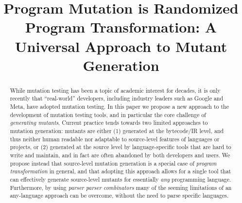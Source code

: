 \documentclass[sigconf,review, anonymous]{acmart}
\begin{document}
\title{Program Mutation is Randomized Program Transformation: A
  Universal Approach to Mutant Generation}




\newcommand{\mr}[2]{\multirow{#1}{*}{#2}}
\newcommand{\mc}[3]{\multicolumn{#1}{#2}{#3}}
\newcommand{\um}{\texttt{universalmutator}\xspace}
\newcommand{\clg}[1]{\textcolor{blue}{#1}}
\newcommand{\adg}[1]{\textcolor{purple}{#1}}
\newcommand{\kj}[1]{\textcolor{olive}{#1}}

\newcommand{\averageprojvariance}{402}
\newcommand{\averagevariance}{604}
\newcommand{\outliertotalfiles}{26}
\newcommand{\outliertestissues}{12}
\newcommand{\outlierumissues}{7}
\newcommand{\outlierunclear}{7}
\newcommand{\allcorr}{0.7479}
\newcommand{\covcorr}{0.2066}
\newcommand{\allrsquared}{0.573}
\newcommand{\allr}{0.757}
\newcommand{\covrsquared}{0.021}
\newcommand{\covr}{0.145}


\begin{abstract}
While mutation testing has been a topic of academic interest for
decades, it is only recently that ``real-world'' developers, including
industry leaders such as Google and Meta, have adopted mutation
testing.  In this paper we propose a new approach to the development of mutation
testing tools, and in particular the core challenge of
\emph{generating mutants}.  Current practice tends towards two
limited approaches to mutation generation: mutants are either (1)
generated at the bytecode/IR level, and thus neither human readable
nor adaptable to source-level features of languages or projects, or
(2) generated at the source level by language-specific tools that are
hard to write and maintain, and in fact are often abandoned by both
developers and users.  We propose instead that source-level mutation
generation is a special case of \emph{program transformation} in
general, and that adopting this approach allows for a single tool that
can effectively generate source-level mutants for essentially
\emph{any} programming language. Furthermore, by using \emph{parser
  parser combinators} many of the seeming limitations of an
any-language approach can be overcome, without the need to parse
specific languages.
\end{abstract}
\end{document}
